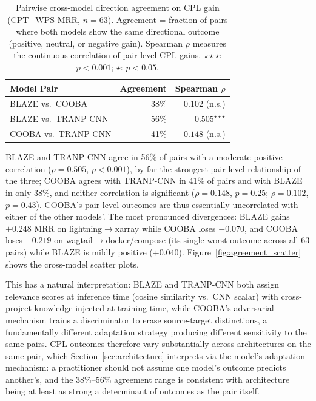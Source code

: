 \documentclass[a4paper,fleqn]{cas-dc}
\begin{document}
\begin{table}[t]
\centering
\caption{Pairwise cross-model direction agreement on CPL gain (CPT$-$WPS MRR, $n = 63$).
Agreement = fraction of pairs where both models show the same directional outcome
(positive, neutral, or negative gain). Spearman $\rho$ measures the continuous
correlation of pair-level CPL gains. $\star\star\star$: $p < 0.001$; $\star$: $p < 0.05$.}
\label{tab:model_agreement}
\small
\begin{tabular}{@{}lrr@{}}
\toprule
\textbf{Model Pair} & \textbf{Agreement} & \textbf{Spearman $\rho$} \\
\midrule
BLAZE vs.\ COOBA      & 38\% & $0.102$ (n.s.) \\
BLAZE vs.\ TRANP-CNN  & 56\% & $0.505^{\star\star\star}$ \\
COOBA vs.\ TRANP-CNN  & 41\% & $0.148$ (n.s.) \\
\bottomrule
\end{tabular}
\end{table}

BLAZE and TRANP-CNN agree in 56\% of pairs with a moderate positive
correlation ($\rho = 0.505$, $p < 0.001$), by far the strongest pair-level
relationship of the three; COOBA agrees with TRANP-CNN in 41\% of
pairs and with BLAZE in only 38\%, and neither correlation is significant
($\rho = 0.148$, $p = 0.25$; $\rho = 0.102$, $p = 0.43$). COOBA's pair-level
outcomes are thus essentially uncorrelated with either of the other models'.
The most pronounced divergences: BLAZE gains $+0.248$ MRR on
lightning$\to$xarray while COOBA loses $-0.070$, and COOBA loses $-0.219$ on
wagtail$\to$docker/compose (its single worst outcome across all 63 pairs)
while BLAZE is mildly positive ($+0.040$).
Figure~\ref{fig:agreement_scatter} shows the cross-model scatter plots.

 This has a natural interpretation: BLAZE and TRANP-CNN both
assign relevance scores at inference time (cosine similarity vs.\ CNN
scalar) with cross-project knowledge injected at training time, while
COOBA's adversarial mechanism trains a discriminator to erase
source-target distinctions, a fundamentally different adaptation
strategy producing different sensitivity to the same pairs. CPL outcomes
therefore vary substantially across architectures on the same pair, which
Section~\ref{sec:architecture} interprets via the model's adaptation
mechanism: a practitioner should not assume one model's outcome predicts
another's, and the 38\%--56\% agreement range is consistent with
architecture being at least as strong a determinant of outcomes as the
pair itself.
\end{document}

